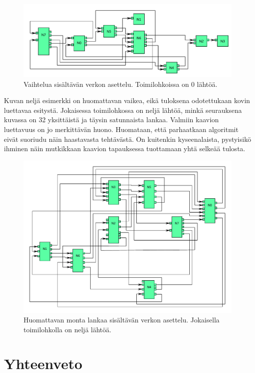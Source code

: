 \documentclass[finnish,12pt]{article}
\begin{document}
\begin{figure}[ht]
	\includegraphics[width=\textwidth]{esim2.pdf}
	\caption{Vaihtelua sisältävän verkon asettelu. Toimilohkoissa on 0 lähtöä.}
\end{figure}

Kuvan neljä esimerkki on huomattavan vaikea, eikä tuloksena odotettukaan kovin luettavaa esitystä.
Jokaisessa toimilohkossa on neljä lähtöä, minkä seurauksena kuvassa on 32 yksittäistä ja täysin satunnaista lankaa.
Valmiin kaavion luettavuus on jo merkittävän huono. Huomataan, että parhaatkaan algoritmit eivät suoriudu näin haastavasta tehtävästä.
On kuitenkin kyseenalaista, pystyisikö ihminen näin mutkikkaan kaavion tapauksessa tuottamaan yhtä selkeää tulosta.

\begin{figure}[ht]
	\includegraphics[width=\textwidth]{esim3.pdf}
	\caption{Huomattavan monta lankaa sisältävän verkon asettelu. Jokaisella toimilohkolla on neljä lähtöä.}
\end{figure}



	\clearpage
	\section{Yhteenveto}
\end{document}
